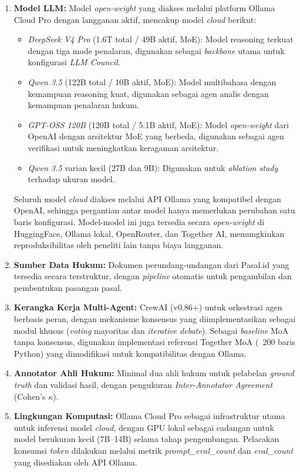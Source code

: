 \begin{enumerate}
	\item \textbf{Model LLM:} Model \textit{open-weight} yang diakses melalui platform Ollama Cloud Pro dengan langganan aktif, mencakup model \textit{cloud} berikut:
	\begin{itemize}
		\item \textit{DeepSeek V4 Pro} (1.6T total / 49B aktif, MoE): Model reasoning terkuat dengan tiga mode penalaran, digunakan sebagai \textit{backbone} utama untuk konfigurasi \textit{LLM Council}.
		\item \textit{Qwen 3.5} (122B total / 10B aktif, MoE): Model multibahasa dengan kemampuan reasoning kuat, digunakan sebagai agen analis dengan kemampuan penalaran hukum.
		\item \textit{GPT-OSS 120B} (120B total / 5.1B aktif, MoE): Model \textit{open-weight} dari OpenAI dengan arsitektur MoE yang berbeda, digunakan sebagai agen verifikasi untuk meningkatkan keragaman arsitektur.
		\item \textit{Qwen 3.5} varian kecil (27B dan 9B): Digunakan untuk \textit{ablation study} terhadap ukuran model.
	\end{itemize}
	Seluruh model \textit{cloud} diakses melalui API Ollama yang kompatibel dengan OpenAI, sehingga pergantian antar model hanya memerlukan perubahan satu baris konfigurasi. Model-model ini juga tersedia secara \textit{open-weight} di HuggingFace, Ollama lokal, OpenRouter, dan Together AI, memungkinkan reproduksibilitas oleh peneliti lain tanpa biaya langganan.

	\item \textbf{Sumber Data Hukum:} Dokumen perundang-undangan dari Pasal.id yang tersedia secara terstruktur, dengan \textit{pipeline} otomatis untuk pengambilan dan pembentukan pasangan pasal.

	\item \textbf{Kerangka Kerja Multi-Agent:} CrewAI (v0.86+) untuk orkestrasi agen berbasis peran, dengan mekanisme konsensus yang diimplementasikan sebagai modul khusus (\textit{voting} mayoritas dan \textit{iterative debate}). Sebagai \textit{baseline} MoA tanpa konsensus, digunakan implementasi referensi Together MoA (~200 baris Python) yang dimodifikasi untuk kompatibilitas dengan Ollama.

	\item \textbf{Annotator Ahli Hukum:} Minimal dua ahli hukum untuk pelabelan \textit{ground truth} dan validasi hasil, dengan pengukuran \textit{Inter-Annotator Agreement} (Cohen's $\kappa$).

	\item \textbf{Lingkungan Komputasi:} Ollama Cloud Pro sebagai infrastruktur utama untuk inferensi model \textit{cloud}, dengan GPU lokal sebagai cadangan untuk model berukuran kecil (7B--14B) selama tahap pengembangan. Pelacakan konsumsi \textit{token} dilakukan melalui metrik \textit{prompt\_eval\_count} dan \textit{eval\_count} yang disediakan oleh API Ollama.
\end{enumerate}